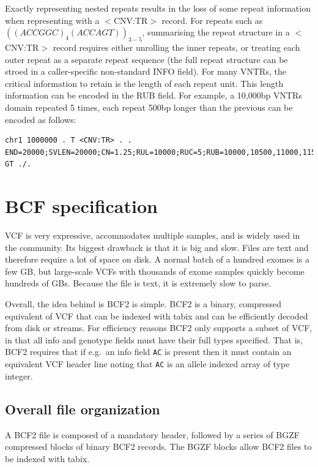 \documentclass[8pt]{article}
\begin{document}
Exactly representing nested repeats results in the loss of some repeat information when representing with a $<$CNV:TR$>$ record.
For repeats such as $((ACCGGC)_{4}(ACCAGT))_{3-5}$, summarising the repeat structure in a $<$CNV:TR$>$ record requires either unrolling the inner repeats, or treating each outer repeat as a separate repeat sequence (the full repeat structure can be stroed in a caller-specific non-standard INFO field).
For many VNTRs, the critical information to retain is the length of each repeat unit.
This length information can be encoded in the RUB field.
For example, a 10,000bp VNTRs domain repeated 5 times, each repeat 500bp longer than the previous can be encoded as follows:

\footnotesize
\begin{verbatim}
chr1 1000000 . T <CNV:TR> . . END=20000;SVLEN=20000;CN=1.25;RUL=10000;RUC=5;RUB=10000,10500,11000,11500,12000 GT ./.
\end{verbatim}
\normalsize


	
	
\pagebreak
\section{BCF specification}

VCF is very expressive, accommodates multiple samples, and is widely used in the community.
Its biggest drawback is that it is big and slow.
Files are text and therefore require a lot of space on disk.
A normal batch of a hundred exomes is a few GB, but large-scale VCFs with thousands of exome samples quickly become hundreds of GBs.
Because the file is text, it is extremely slow to parse.

Overall, the idea behind is BCF2 is simple.
BCF2 is a binary, compressed equivalent of VCF that can be indexed with tabix and can be efficiently decoded from disk or streams.
For efficiency reasons BCF2 only supports a subset of VCF, in that all info and genotype fields must have their full types specified.
That is, BCF2 requires that if e.g.\ an info field {\tt AC} is present then it must contain an equivalent VCF header line noting that {\tt AC} is an allele indexed array of type integer.

\subsection{Overall file organization}

A BCF2 file is composed of a mandatory header, followed by a series of BGZF compressed blocks of binary BCF2 records.
The BGZF blocks allow BCF2 files to be indexed with tabix.
\end{document}
